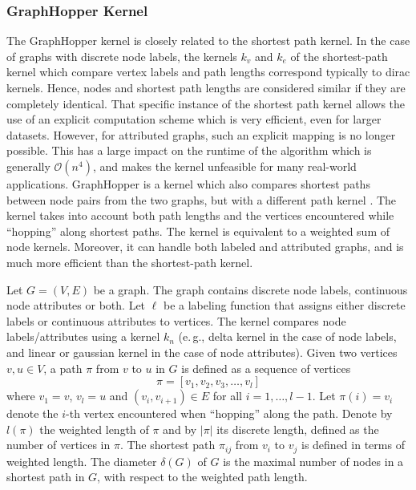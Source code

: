 \documentclass[twoside,11pt]{article}
\newcommand{\eg}{e.\,g., }
\begin{document}
\subsubsection{GraphHopper Kernel}
The GraphHopper kernel is closely related to the shortest path kernel.
In the case of graphs with discrete node labels, the kernels $k_v$ and $k_e$ of the shortest-path kernel which compare vertex labels and path lengths correspond typically to dirac kernels.
Hence, nodes and shortest path lengths are considered similar if they are completely identical.
That specific instance of the shortest path kernel allows the use of an explicit computation scheme which is very efficient, even for larger datasets.
However, for attributed graphs, such an explicit mapping is no longer possible.
This has a large impact on the runtime of the algorithm which is generally $\mathcal{O}(n^4)$, and makes the kernel unfeasible for many real-world applications.
GraphHopper is a kernel which also compares shortest paths between node pairs from the two graphs, but with a different path kernel
.
The kernel takes into account both path lengths and the vertices encountered while ``hopping'' along shortest paths.
The kernel is equivalent to a weighted sum of node kernels.
Moreover, it can handle both labeled and attributed graphs, and is much more efficient than the shortest-path kernel.

Let $G=(V,E)$ be a graph.
The graph contains discrete node labels, continuous node attributes or both.
Let $\ell$ be a labeling function that assigns either discrete labels or continuous attributes to vertices.
The kernel compares node labels/attributes using a kernel $k_n$ (\eg delta kernel in the case of node labels, and linear or gaussian kernel in the case of node attributes).
Given two vertices $v,u \in V$, a path $\pi$ from $v$ to $u$ in $G$ is defined as a sequence of vertices
\begin{equation}
    \pi = [v_1, v_2, v_3, \ldots, v_l]
\end{equation}
where $v_1 = v$, $v_l = u$ and $(v_i, v_{i+1}) \in E$ for all $i=1,\ldots,l-1$.
Let $\pi(i) = v_i$ denote the $i$-th vertex encountered when ``hopping'' along the path.
Denote by $l(\pi)$ the weighted length of $\pi$ and by $|\pi|$ its discrete length, defined as the number of vertices in $\pi$.
The shortest path $\pi_{ij}$ from $v_i$ to $v_j$ is defined in terms of weighted length.
The diameter $\delta(G)$ of $G$ is the maximal number of nodes in a shortest path in $G$, with respect to the weighted path length.
\end{document}
